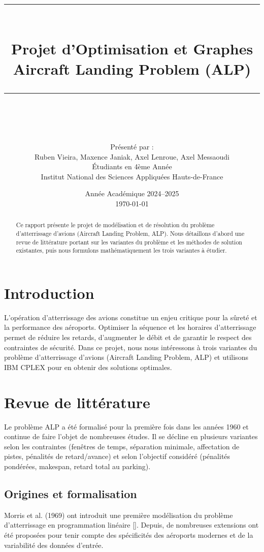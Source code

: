 \documentclass[a4paper,12pt]{report}
\title{
    \vspace{-2cm}
    \textcolor{insablue}{\rule{\linewidth}{0.5mm}}\\[0.4cm]
    \Huge\bfseries Projet d'Optimisation et Graphes\\[0.2cm]
    \Large\textcolor{insagray}{Aircraft Landing Problem (ALP)}\\[0.4cm]
    \textcolor{insablue}{\rule{\linewidth}{0.5mm}}\\[1.5cm]
}
\author{
    \Large Présenté par :\\[0.3cm]
    \large Ruben Vieira, Maxence Janiak, Axel Lenroue, Axel Messaoudi\\[0.5cm]
    \normalsize Étudiants en 4ème Année\\
    Institut National des Sciences Appliquées Hauts-de-France\\[1.5cm]
}
\date{\large Année Académique 2024--2025\\[0.5cm] \today}
\begin{document}
\maketitle

\begin{abstract}
Ce rapport présente le projet de modélisation et de résolution du problème d'atterrissage d'avions (Aircraft Landing Problem, ALP). Nous détaillons d'abord une revue de littérature portant sur les variantes du problème et les méthodes de solution existantes, puis nous formulons mathématiquement les trois variantes à étudier.
\end{abstract}

\tableofcontents
\newpage

\section{Introduction}
L'opération d'atterrissage des avions constitue un enjeu critique pour la sûreté et la performance des aéroports. Optimiser la séquence et les horaires d'atterrissage permet de réduire les retards, d'augmenter le débit et de garantir le respect des contraintes de sécurité. Dans ce projet, nous nous intéressons à trois variantes du problème d'atterrissage d'avions (Aircraft Landing Problem, ALP) et utilisons IBM CPLEX pour en obtenir des solutions optimales.

\section{Revue de littérature}
Le problème ALP a été formalisé pour la première fois dans les années 1960 et continue de faire l'objet de nombreuses études. Il se décline en plusieurs variantes selon les contraintes (fenêtres de temps, séparation minimale, affectation de pistes, pénalités de retard/avance) et selon l'objectif considéré (pénalités pondérées, makespan, retard total au parking).

\subsection{Origines et formalisation}
Morris et al. (1969) ont introduit une première modélisation du problème d'atterrissage en programmation linéaire [\citep{morris1969aircraft}]. Depuis, de nombreuses extensions ont été proposées pour tenir compte des spécificités des aéroports modernes et de la variabilité des données d'entrée.
\end{document}
